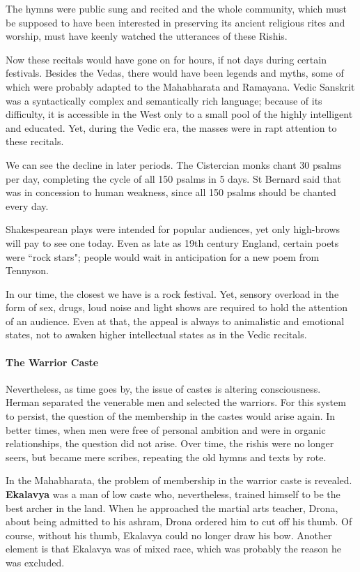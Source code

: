 \begin{quotex}
The hymns were public sung and recited and the whole community, which must be supposed to have been interested in preserving its ancient religious rites and worship, must have keenly watched the utterances of these Rishis.

\end{quotex}
Now these recitals would have gone on for hours, if not days during certain festivals. Besides the Vedas, there would have been legends and myths, some of which were probably adapted to the Mahabharata and Ramayana. Vedic Sanskrit was a syntactically complex and semantically rich language; because of its difficulty, it is accessible in the West only to a small pool of the highly intelligent and educated. Yet, during the Vedic era, the masses were in rapt attention to these recitals.

We can see the decline in later periods. The Cistercian monks chant 30 psalms per day, completing the cycle of all 150 psalms in 5 days. St Bernard said that was in concession to human weakness, since all 150 psalms should be chanted every day.

Shakespearean plays were intended for popular audiences, yet only high-brows will pay to see one today. Even as late as 19th century England, certain poets were ``rock stars"; people would wait in anticipation for a new poem from Tennyson.

In our time, the closest we have is a rock festival. Yet, sensory overload in the form of sex, drugs, loud noise and light shows are required to hold the attention of an audience. Even at that, the appeal is always to animalistic and emotional states, not to awaken higher intellectual states as in the Vedic recitals.

\paragraph{The Warrior Caste}
Nevertheless, as time goes by, the issue of castes is altering consciousness. Herman separated the venerable men and selected the warriors. For this system to persist, the question of the membership in the castes would arise again. In better times, when men were free of personal ambition and were in organic relationships, the question did not arise. Over time, the rishis were no longer seers, but became mere scribes, repeating the old hymns and texts by rote.

In the Mahabharata, the problem of membership in the warrior caste is revealed. \textbf{Ekalavya} was a man of low caste who, nevertheless, trained himself to be the best archer in the land. When he approached the martial arts teacher, Drona, about being admitted to his ashram, Drona ordered him to cut off his thumb. Of course, without his thumb, Ekalavya could no longer draw his bow. Another element is that Ekalavya was of mixed race, which was probably the reason he was excluded.


